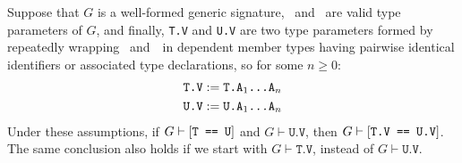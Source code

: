 \documentclass[../generics]{subfiles}
\begin{document}
\begin{lemma}\label{general member type}
Suppose that $G$ is a well-formed generic signature, \tT\ and \tU\ are valid type parameters of $G$, and finally, \texttt{T.V} and \texttt{U.V} are two type parameters formed by repeatedly wrapping \tT~and~\tU\ in dependent member types having pairwise identical identifiers or associated type declarations, so for some $n\geq 0$:
\begin{gather*}
\texttt{T.V} := \texttt{T.$\texttt{A}_1$...$\texttt{A}_n$}\\
\texttt{U.V} := \texttt{U.$\texttt{A}_1$...$\texttt{A}_n$}
\end{gather*}
Under these assumptions, if $G\vdash[\texttt{T == U}]$ and $G\vdash\texttt{U.V}$, then $G\vdash[\texttt{T.V == U.V}]$. The same conclusion also holds if we start with $G\vdash\texttt{T.V}$, instead of $G\vdash\texttt{U.V}$.
\end{lemma}
\end{document}
